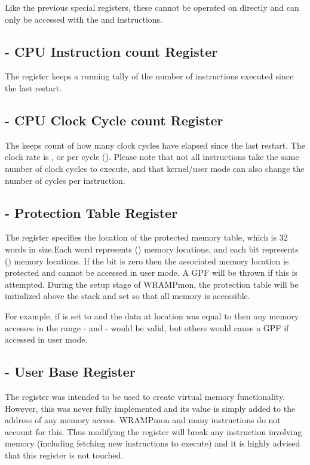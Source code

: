 Like the previous special registers, these cannot be operated on directly 
and can only be accessed with the  and  instructions.

\subsection{ - CPU Instruction count Register}

The  register keeps a running tally of the number of instructions 
executed since the last restart.

\subsection{ - CPU Clock Cycle count Register}

The  keeps count of how many clock cycles have elapsed since the 
last restart.
The clock rate is , or  per cycle ().
Please note that not all instructions take the same number of clock cycles to 
execute, and that kernel/user mode can also change the number of cycles per instruction.

\subsection{ - Protection Table Register}
\label{sec:MPU}

The  register specifies the location of the protected memory table, 
which is 32 words in size.Each word represents  () memory
locations, and each bit represents  () memory locations.
If the bit is zero then the associated memory location is protected and cannot 
be accessed in user mode. A GPF will be thrown if this is attempted.
During the setup stage of WRAMPmon, the protection table will be initialized 
above the stack and set so that all memory is accessible.

For example, if  is set to  and the data at location 
 was equal to  then any memory accesses in the range 
- and - would be valid, but others 
would cause a GPF if accessed in user mode.

\subsection{ - User Base Register}

The  register was intended to be used to create virtual memory 
functionality.
However, this was never fully implemented and its value is simply added to the
address of any memory access. WRAMPmon and many instructions do not account
for this. Thus modifying the  register will break any instruction 
involving memory (including fetching new instructions to execute) and it is 
highly advised that this register is not touched.

